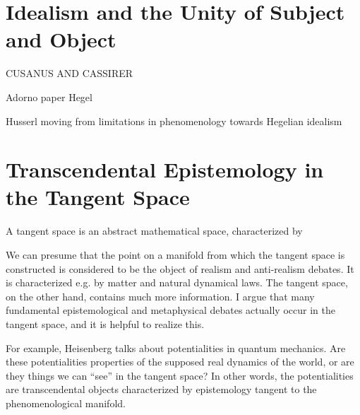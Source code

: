 



\section{Idealism and the Unity of Subject and Object}

CUSANUS AND CASSIRER \citep{Cassirer1927}

Adorno paper
Hegel

Husserl moving from limitations in phenomenology towards Hegelian idealism



\section{Transcendental Epistemology in the Tangent Space}

A tangent space is an abstract mathematical space, characterized by 

We can presume that the point on a manifold from which the tangent space is constructed is considered to be the object of realism and anti-realism debates.  It is characterized e.g. by matter and natural dynamical laws.  The tangent space, on the other hand, contains much more information.  I argue that many fundamental epistemological and metaphysical debates actually occur in the tangent space, and it is helpful to realize this.

For example, Heisenberg talks about potentialities in quantum mechanics.  Are these potentialities properties of the supposed real dynamics of the world, or are they things we can ``see'' in the tangent space?  In other words, the potentialities are transcendental objects characterized by epistemology tangent to the phenomenological manifold.

